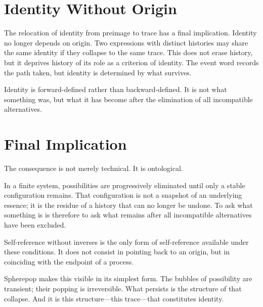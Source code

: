 \documentclass[12pt, oneside]{amsbook}
\theoremstyle{plain}
\theoremstyle{definition}
\theoremstyle{remark}
\begin{document}
\section{Identity Without Origin}
\label{sec:concl:identity}

The relocation of identity from preimage to trace has a final implication.
Identity no longer depends on origin. Two expressions with distinct histories
may share the same identity if they collapse to the same trace. This does not
erase history, but it deprives history of its role as a criterion of identity.
The event word records the path taken, but identity is determined by what
survives.

Identity is forward-defined rather than backward-defined. It is not what
something was, but what it has become after the elimination of all incompatible
alternatives.

\section{Final Implication}
\label{sec:concl:final}

The consequence is not merely technical. It is ontological.

In a finite system, possibilities are progressively eliminated until only a
stable configuration remains. That configuration is not a snapshot of an
underlying essence; it is the residue of a history that can no longer be
undone. To ask what something is is therefore to ask what remains after all
incompatible alternatives have been excluded.

Self-reference without inverses is the only form of self-reference available
under these conditions. It does not consist in pointing back to an origin, but
in coinciding with the endpoint of a process.

Spherepop makes this visible in its simplest form. The bubbles of possibility
are transient; their popping is irreversible. What persists is the structure of
that collapse. And it is this structure---this trace---that constitutes
identity.
\end{document}
